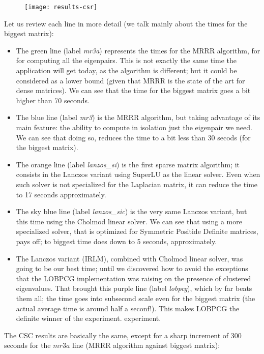 \begin{figure}[H]
  \centering
  \texttt{[image: results-csr]}
\end{figure}

Let us review each line in more detail (we talk mainly about the times
for the biggest matrix):

\begin{itemize}
\item The green line (label \emph{mr3a}) represents the times for the
  MRRR algorithm, for 
  for computing all the eigenpairs. This is not exactly the same time
  the application will get today, as the algorithm is different; but
  it could be considered as a lower bound (given that MRRR is the
  state of the art for dense matrices). We can see that the time for
  the biggest matrix goes a bit higher than 70 seconds.
\item The blue line (label \emph{mr3}) is the MRRR algorithm, but
  taking advantage of its main feature: the ability to compute in
  isolation just the eigenpair we need. We can see that doing so,
  reduces the time to a bit less than 30 secods (for the biggest
  matrix).
\item The orange line (label \emph{lanzos\_si}) is the first sparse
  matrix algorithm; it consists in the Lanczos variant using SuperLU
  as the linear solver. Even when such solver is not specialized for
  the Laplacian matrix, it can reduce the time to 17 seconds
  approximately.
  \item The sky blue line (label \emph{lanzos\_sic}) is the very same
    Lanczos variant, but this time using the Cholmod linear solver. We
    can see that using a more specialized solver, that is optimized
    for Symmetric Positide Definite matrices, pays off; to biggest
    time does down to 5 seconds, approximately.
  \item The Lanczos variant (IRLM), combined with Cholmod linear
    solver, was going to be our best time; until we discovered how to
    avoid the exceptions that the LOBPCG implementation was raising on
    the presence of clustered eigenvalues. That brought this purple
    line (label \emph{lobpcg}), which by far beats them all; the time
    goes into subsecond scale even for the biggest matrix (the actual
    average time is around half a seconf!). This makes LOBPCG the
    definite winner of the experiment. 
    experiment. 
\end{itemize}

The CSC results are basically the same, except for a sharp increment of 300
seconds for the $mr3a$ line (MRRR algorithm against biggest matrix):

